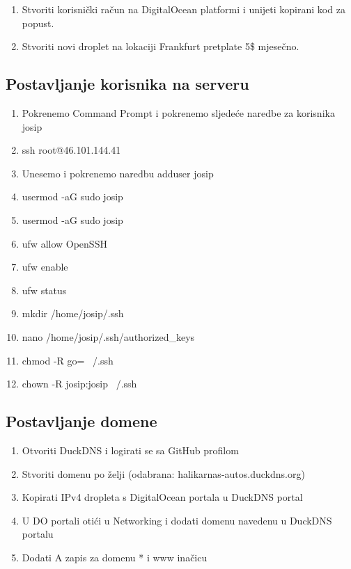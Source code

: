 \begin{flushleft}
\begin{enumerate}
			\item Stvoriti korisnički račun na DigitalOcean platformi i unijeti kopirani kod za popust. 
			
			\item  Stvoriti novi droplet na lokaciji Frankfurt
			 pretplate 5\$ mjesečno. 
			
		\end{enumerate}
		
		\subsection{Postavljanje korisnika na serveru}
	    \begin{enumerate}
	       	\item Pokrenemo Command Prompt i pokrenemo sljedeće naredbe za korisnika josip
			\item ssh root@46.101.144.41
			\item Unesemo i pokrenemo naredbu adduser josip  
			\item usermod -aG sudo josip
			\item usermod -aG sudo josip
			\item ufw allow OpenSSH
			\item ufw enable
			\item ufw status
			\item mkdir /home/josip/.ssh
			\item nano /home/josip/.ssh/authorized\_keys
			\item chmod -R go= ~/.ssh
			\item chown -R josip:josip ~/.ssh
		\end{enumerate}
	        
	   \subsection{Postavljanje domene}
	   \begin{enumerate}
	        \item Otvoriti DuckDNS i logirati se sa GitHub profilom
	        \item Stvoriti domenu po želji (odabrana: halikarnas-autos.duckdns.org)
	        \item Kopirati IPv4 dropleta s DigitalOcean portala u DuckDNS portal
	        \item U DO portali otići u Networking i dodati domenu navedenu u DuckDNS portalu
	        \item Dodati A zapis za domenu * i www inačicu
	   \end{enumerate}
	   

\end{flushleft}
